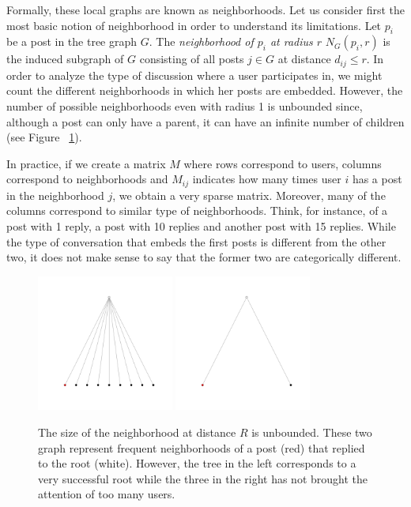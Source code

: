\documentclass[smallextended]{svjour3}          %
\begin{document}
Formally, these local graphs are known as neighborhoods. Let us consider first the most basic notion of neighborhood in order to understand its limitations. Let $p_i$ be a post in the tree graph $G$. The \textit{neighborhood of $p_i$ at radius $r$} $N_G(p_i,r)$ is the induced subgraph of $G$ consisting of all posts $j \in G$ at distance $d_{ij}\leq r$. In order to analyze the type of discussion where a user participates in, we might count the different neighborhoods in which her posts are embedded. However, the number of possible neighborhoods even with radius 1 is unbounded since, although a post can only have a parent, it can have an infinite number of children (see Figure~ \ref{fig:large_neighboorhood}). 

In practice, if we create a matrix $M$ where rows correspond to users, columns correspond to neighborhoods and $M_{ij}$ indicates how many times user $i$ has a post in the neighborhood $j$,  we obtain a very sparse matrix. Moreover, many of the columns correspond to similar type of neighborhoods. Think, for instance, of a post with 1 reply, a post with 10 replies and another post with 15 replies. While the type of conversation that embeds the first posts is different from the other two, it does not make sense to say that the former two are categorically different.

\begin{figure}
	\centering
	\includegraphics[width=0.4\textwidth]{large_neighborhood}
	\includegraphics[width=0.4\textwidth]{small_neighborhood}
	\caption{The size of the neighborhood at distance $R$ is unbounded. These two graph represent frequent neighborhoods of a post (red) that replied to the root (white). However, the tree in the left corresponds to a very successful root while the three in the right has not brought the attention of too many users.}
	\label{fig:large_neighboorhood}
\end{figure}
\end{document}
